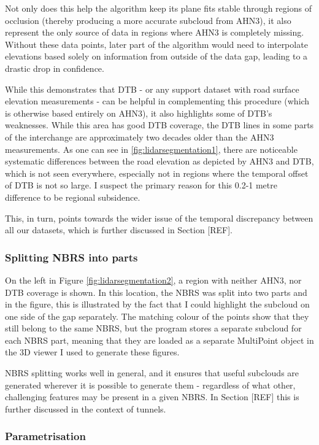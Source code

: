 Not only does this help the algorithm keep its plane fits stable through regions of occlusion (thereby producing a more accurate subcloud from AHN3), it also represent the only source of data in regions where AHN3 is completely missing. Without these data points, later part of the algorithm would need to interpolate elevations based solely on information from outside of the data gap, leading to a drastic drop in confidence.

While this demonstrates that DTB - or any support dataset with road surface elevation measurements - can be helpful in complementing this procedure (which is otherwise based entirely on AHN3), it also highlights some of DTB's weaknesses. While this area has good DTB coverage, the DTB lines in some parts of the interchange are approximately two decades older than the AHN3 measurements. As one can see in \ref{fig:lidarsegmentation1}, there are noticeable systematic differences between the road elevation as depicted by AHN3 and DTB, which is not seen everywhere, especially not in regions where the temporal offset of DTB is not so large. I suspect the primary reason for this 0.2-1 metre difference to be regional subsidence.

This, in turn, points towards the wider issue of the temporal discrepancy between all our datasets, which is further discussed in Section [REF].

\subsubsection{Splitting NBRS into parts}

On the left in Figure \ref{fig:lidarsegmentation2}, a region with neither AHN3, nor DTB coverage is shown. In this location, the NBRS was split into two parts and in the figure, this is illustrated by the fact that I could highlight the subcloud on one side of the gap separately. The matching colour of the points show that they still belong to the same NBRS, but the program stores a separate subcloud for each NBRS part, meaning that they are loaded as a separate MultiPoint object in the 3D viewer I used to generate these figures.

NBRS splitting works well in general, and it ensures that useful subclouds are generated wherever it is possible to generate them - regardless of what other, challenging features may be present in a given NBRS. In Section [REF] this is further discussed in the context of tunnels.

\subsubsection{Parametrisation}

